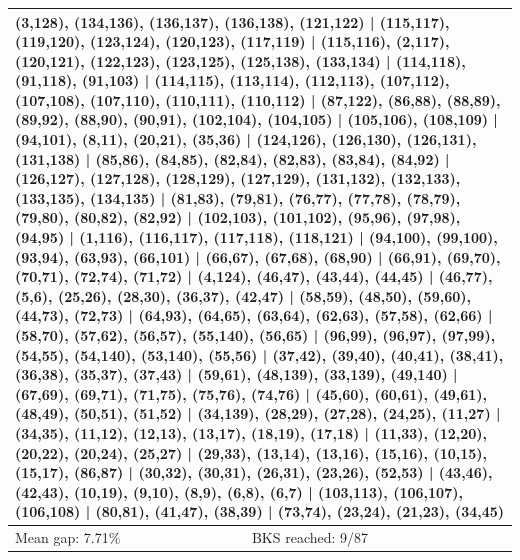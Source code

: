 \begin{longtable}{lrrrrrrrrl}
\multicolumn{10}{p{0.96\linewidth}}{\tiny\raggedright\arraybackslash (3,128), (134,136), (136,137), (136,138), (121,122) | (115,117), (119,120), (123,124), (120,123), (117,119) | (115,116), (2,117), (120,121), (122,123), (123,125), (125,138), (133,134) | (114,118), (91,118), (91,103) | (114,115), (113,114), (112,113), (107,112), (107,108), (107,110), (110,111), (110,112) | (87,122), (86,88), (88,89), (89,92), (88,90), (90,91), (102,104), (104,105) | (105,106), (108,109) | (94,101), (8,11), (20,21), (35,36) | (124,126), (126,130), (126,131), (131,138) | (85,86), (84,85), (82,84), (82,83), (83,84), (84,92) | (126,127), (127,128), (128,129), (127,129), (131,132), (132,133), (133,135), (134,135) | (81,83), (79,81), (76,77), (77,78), (78,79), (79,80), (80,82), (82,92) | (102,103), (101,102), (95,96), (97,98), (94,95) | (1,116), (116,117), (117,118), (118,121) | (94,100), (99,100), (93,94), (63,93), (66,101) | (66,67), (67,68), (68,90) | (66,91), (69,70), (70,71), (72,74), (71,72) | (4,124), (46,47), (43,44), (44,45) | (46,77), (5,6), (25,26), (28,30), (36,37), (42,47) | (58,59), (48,50), (59,60), (44,73), (72,73) | (64,93), (64,65), (63,64), (62,63), (57,58), (62,66) | (58,70), (57,62), (56,57), (55,140), (56,65) | (96,99), (96,97), (97,99), (54,55), (54,140), (53,140), (55,56) | (37,42), (39,40), (40,41), (38,41), (36,38), (35,37), (37,43) | (59,61), (48,139), (33,139), (49,140) | (67,69), (69,71), (71,75), (75,76), (74,76) | (45,60), (60,61), (49,61), (48,49), (50,51), (51,52) | (34,139), (28,29), (27,28), (24,25), (11,27) | (34,35), (11,12), (12,13), (13,17), (18,19), (17,18) | (11,33), (12,20), (20,22), (20,24), (25,27) | (29,33), (13,14), (13,16), (15,16), (10,15), (15,17), (86,87) | (30,32), (30,31), (26,31), (23,26), (52,53) | (43,46), (42,43), (10,19), (9,10), (8,9), (6,8), (6,7) | (103,113), (106,107), (106,108) | (80,81), (41,47), (38,39) | (73,74), (23,24), (21,23), (34,45)} \\[2pt]
\midrule
\multicolumn{3}{l}{Mean gap: 7.71\%} & \multicolumn{7}{l}{BKS reached: 9/87} \\
\end{longtable}
\endgroup